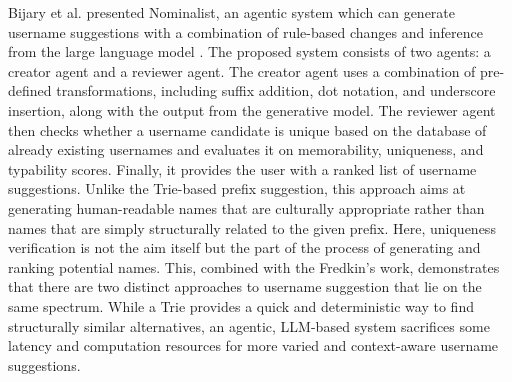 \documentclass[conference]{IEEEtran}
\begin{document}
Bijary et al. presented Nominalist, an agentic system which can generate username suggestions with a combination of rule-based changes and inference from the large language model \cite{b6}. The proposed system consists of two agents: a creator agent and a reviewer agent. The creator agent uses a combination of pre-defined transformations, including suffix addition, dot notation, and underscore insertion, along with the output from the generative model. The reviewer agent then checks whether a username candidate is unique based on the database of already existing usernames and evaluates it on memorability, uniqueness, and typability scores. Finally, it provides the user with a ranked list of username suggestions. Unlike the Trie-based prefix suggestion, this approach aims at generating human-readable names that are culturally appropriate rather than names that are simply structurally related to the given prefix. Here, uniqueness verification is not the aim itself but the part of the process of generating and ranking potential names. This, combined with the Fredkin’s work, demonstrates that there are two distinct approaches to username suggestion that lie on the same spectrum. While a Trie provides a quick and deterministic way to find structurally similar alternatives, an agentic, LLM-based system sacrifices some latency and computation resources for more varied and context-aware username suggestions.
\end{document}
